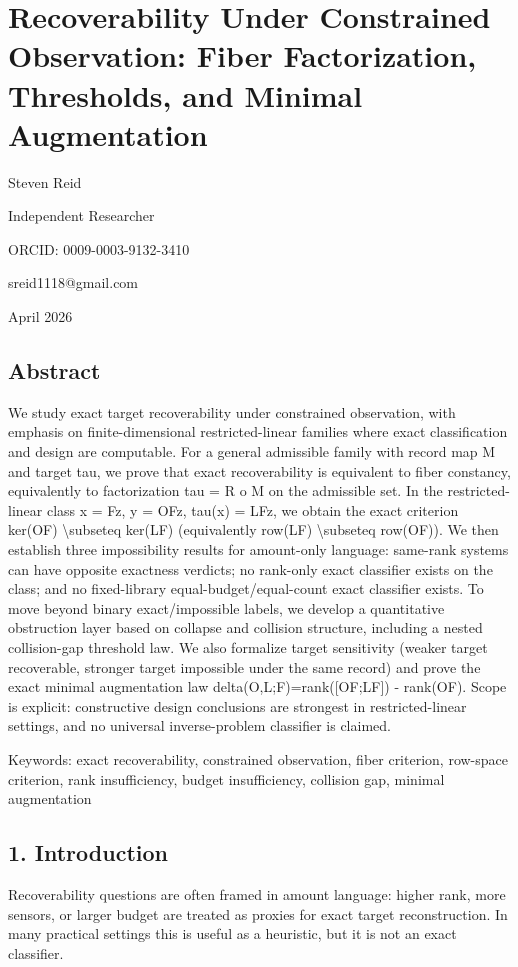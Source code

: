 \documentclass[11pt]{article}
\begin{document}
\section*{Recoverability Under Constrained Observation: Fiber Factorization, Thresholds, and Minimal Augmentation}

Steven Reid

Independent Researcher

ORCID: 0009-0003-9132-3410

sreid1118@gmail.com

April 2026


\subsection*{Abstract}
We study exact target recoverability under constrained observation, with emphasis on finite-dimensional restricted-linear families where exact classification and design are computable. For a general admissible family with record map M and target tau, we prove that exact recoverability is equivalent to fiber constancy, equivalently to factorization tau = R o M on the admissible set. In the restricted-linear class x = Fz, y = OFz, tau(x) = LFz, we obtain the exact criterion ker(OF) \textbackslash{}subseteq ker(LF) (equivalently row(LF) \textbackslash{}subseteq row(OF)). We then establish three impossibility results for amount-only language: same-rank systems can have opposite exactness verdicts; no rank-only exact classifier exists on the class; and no fixed-library equal-budget/equal-count exact classifier exists. To move beyond binary exact/impossible labels, we develop a quantitative obstruction layer based on collapse and collision structure, including a nested collision-gap threshold law. We also formalize target sensitivity (weaker target recoverable, stronger target impossible under the same record) and prove the exact minimal augmentation law delta(O,L;F)=rank([OF;LF]) - rank(OF). Scope is explicit: constructive design conclusions are strongest in restricted-linear settings, and no universal inverse-problem classifier is claimed.


Keywords: exact recoverability, constrained observation, fiber criterion, row-space criterion, rank insufficiency, budget insufficiency, collision gap, minimal augmentation


\subsection*{1. Introduction}
Recoverability questions are often framed in amount language: higher rank, more sensors, or larger budget are treated as proxies for exact target reconstruction. In many practical settings this is useful as a heuristic, but it is not an exact classifier.
\end{document}
